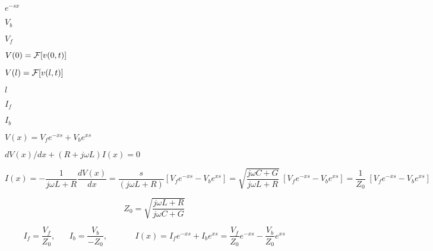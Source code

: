 {\newpage\clearpage
{}%
$e^{-sx}$%
\lthtmlinlinemathZ
\lthtmlcheckvsize\clearpage}

{\newpage\clearpage
{}%
$V_b$%
\lthtmlinlinemathZ
\lthtmlcheckvsize\clearpage}

{\newpage\clearpage
{}%
$V_f$%
\lthtmlinlinemathZ
\lthtmlcheckvsize\clearpage}

{\newpage\clearpage
{}%
$V(0)={\cal F}[v(0,t)]$%
\lthtmlinlinemathZ
\lthtmlcheckvsize\clearpage}

{\newpage\clearpage
{}%
$V(l)={\cal F}[v(l,t)]$%
\lthtmlinlinemathZ
\lthtmlcheckvsize\clearpage}

{\newpage\clearpage
{}%
$l$%
\lthtmlinlinemathZ
\lthtmlcheckvsize\clearpage}

{\newpage\clearpage
{}%
$I_f$%
\lthtmlinlinemathZ
\lthtmlcheckvsize\clearpage}

{\newpage\clearpage
{}%
$I_b$%
\lthtmlinlinemathZ
\lthtmlcheckvsize\clearpage}

{\newpage\clearpage
{}%
$V(x)=V_fe^{-xs}+V_be^{xs}$%
\lthtmlinlinemathZ
\lthtmlcheckvsize\clearpage}

{\newpage\clearpage
{}%
$dV(x)/dx+(R+j\omega L)I(x)=0$%
\lthtmlinlinemathZ
\lthtmlcheckvsize\clearpage}

{\newpage\clearpage
{}%
\begin{displaymath} I(x)=-\frac{1}{j\omega L+R}\frac{dV(x)}{dx}
  =\frac{s}{(j\omega L+R)}[V_f e^{-xs}-V_b e^{xs}]
  =\sqrt{\frac{j\omega C+G}{j\omega L+R}}\;[V_f e^{-xs}-V_b e^{xs}]
  =\frac{1}{Z_0}\;[V_f e^{-xs}-V_b e^{xs}]
\end{displaymath}%
\lthtmldisplayZ
\lthtmlcheckvsize\clearpage}

{\newpage\clearpage
{}%
\begin{displaymath} Z_0=\sqrt{\frac{j\omega L+R}{j\omega C+G}} \end{displaymath}%
\lthtmldisplayZ
\lthtmlcheckvsize\clearpage}

{\newpage\clearpage
{}%
\begin{displaymath} I_f=\frac{V_f}{Z_0},\;\;\;\;\;\;I_b=\frac{V_b}{-Z_0},
\;\;\;\;\;\;\;\;\;\;\;\;I(x)=I_f e^{-xs}+I_b e^{xs}
=\frac{V_f}{Z_0}e^{-xs}-\frac{V_b}{Z_0}e^{xs} \end{displaymath}%
\lthtmldisplayZ
\lthtmlcheckvsize\clearpage}


